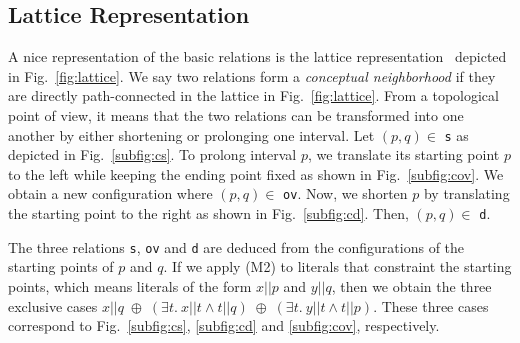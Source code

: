 \documentclass{llncs}
\begin{document}
\subsection{Lattice Representation}
A nice representation of the basic relations is the lattice representation~\cite{Lizgot:1992} depicted in Fig.~\ref{fig:lattice}. %
We say two relations form a \textit{conceptual neighborhood} \cite{Freksa:1992} if they are directly path-connected in the lattice in Fig.~\ref{fig:lattice}. From a topological point of view, it means that the two relations can be transformed into one another by either shortening or prolonging one interval.  Let $(p,q) \in $ \texttt{s}  as depicted in Fig.~\ref{subfig:cs}. To prolong interval $p$, we translate its starting point  $p$ to the left while keeping the ending point fixed  as shown in Fig.~\ref{subfig:cov}. We obtain a new configuration where $(p,q) \in $ \texttt{ov}. Now, we shorten $p$ by translating the starting point to the right as shown in Fig.~\ref{subfig:cd}. Then, $(p,q) \in $ \texttt{d}. %

The three relations \texttt{s}, \texttt{ov} and \texttt{d} are deduced from the configurations of the starting points of $p$ and $q$. If we apply (M2) to literals that constraint the starting points, which means literals of the form $x||p$ and $y||q$, then we obtain the three exclusive cases $x||q\; \oplus\; (\exists t.~x||t \land t||q)\; \oplus \;(\exists t.~y||t \land t||p)$. %
These three cases correspond to Fig.~\ref{subfig:cs}, \ref{subfig:cd} and  \ref{subfig:cov}, respectively.
\end{document}
